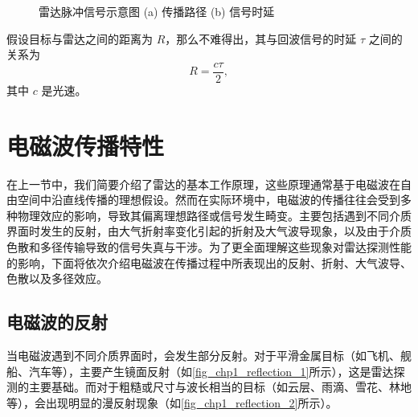 \begin{figure}[htb!]
\begin{subfigure}{.8\textwidth}
        \caption{}
        \label{fig_chp1_radar_pulse_2}
    \end{subfigure}
    \caption{雷达脉冲信号示意图 (a) 传播路径 (b) 信号时延}
    \label{fig_chp1_radar_pulse}
\end{figure}

假设目标与雷达之间的距离为 $R$，那么不难得出，其与回波信号的时延 $\tau$ 之间的关系为
\begin{equation}
    R = \frac{c \tau}{2},
    \label{eq:radar_time_delay}
\end{equation}
其中 $c$ 是光速。

\section{电磁波传播特性}

在上一节中，我们简要介绍了雷达的基本工作原理，这些原理通常基于电磁波在自由空间中沿直线传播的理想假设。然而在实际环境中，电磁波的传播往往会受到多种物理效应的影响，导致其偏离理想路径或信号发生畸变。主要包括遇到不同介质界面时发生的反射，由大气折射率变化引起的折射及大气波导现象，以及由于介质色散和多径传输导致的信号失真与干涉。为了更全面理解这些现象对雷达探测性能的影响，下面将依次介绍电磁波在传播过程中所表现出的反射、折射、大气波导、色散以及多径效应。

\subsection{电磁波的反射}

当电磁波遇到不同介质界面时，会发生部分反射。对于平滑金属目标（如飞机、舰船、汽车等），主要产生镜面反射（如\cref{fig_chp1_reflection_1}所示），这是雷达探测的主要基础。而对于粗糙或尺寸与波长相当的目标（如云层、雨滴、雪花、林地等），会出现明显的漫反射现象（如\cref{fig_chp1_reflection_2}所示）。

